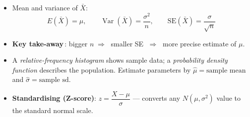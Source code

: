 \documentclass[12pt]{book}
\begin{document}
\begin{itemize}
\item Mean and variance of $\bar{X}$:
      \[
        E(\bar{X})=\mu, \qquad
        \operatorname{Var}(\bar{X})=\frac{\sigma^{2}}{n}, \qquad
        \text{SE}(\bar{X})=\frac{\sigma}{\sqrt{n}}
      \]

\item \textbf{Key take-away}\,: bigger $n\;\Rightarrow\;$ smaller SE $\;\Rightarrow\;$ more precise estimate of $\mu$.

\item A \emph{relative-frequency histogram} shows sample data; a \emph{probability
      density function} describes the population.  
      Estimate parameters by $\hat{\mu}=\text{sample mean}$ and
      $\hat{\sigma}=\text{sample sd}$.
      
\item \textbf{Standardising (Z-score)}: $z = \dfrac{X-\mu}{\sigma}$  — converts any $N(\mu,\sigma^2)$ value to the standard normal scale.


\end{itemize}



\newpage
\pagestyle{fancy}
\end{document}
